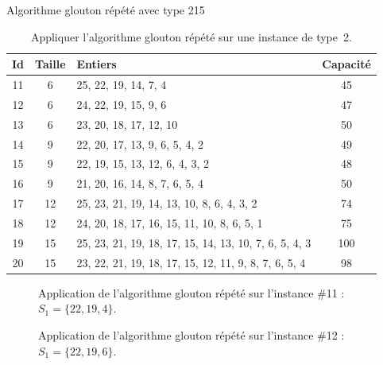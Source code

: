 \begin{exercice}[label=ex:MTGS2]{Algorithme glouton répété avec type 2}{15}

\begin{table}[H]
\centering
\begin{tabular}{cclc}
  \toprule
Id & Taille & Entiers & Capacité \\
  \midrule
 11 &   6 & 25, 22, 19, 14, 7, 4 &  45 \\
   12 &   6 & 24, 22, 19, 15, 9, 6 &  47 \\
   13 &   6 & 23, 20, 18, 17, 12, 10 &  50 \\
   14 &   9 & 22, 20, 17, 13, 9, 6, 5, 4, 2 &  49 \\
   15 &   9 & 22, 19, 15, 13, 12, 6, 4, 3, 2 &  48 \\
   16 &   9 & 21, 20, 16, 14, 8, 7, 6, 5, 4 &  50 \\
   17 &  12 & 25, 23, 21, 19, 14, 13, 10, 8, 6, 4, 3, 2 &  74 \\
   18 &  12 & 24, 20, 18, 17, 16, 15, 11, 10, 8, 6, 5, 1 &  75 \\
   19 &  15 & 25, 23, 21, 19, 18, 17, 15, 14, 13, 10, 7, 6, 5, 4, 3 & 100 \\
   20 &  15 & 23, 22, 21, 19, 18, 17, 15, 12, 11, 9, 8, 7, 6, 5, 4 &  98 \\
   \bottomrule
\end{tabular}
\caption{Appliquer l'algorithme glouton répété sur une instance de type~2.}
\label{tab:MTGS2}
\end{table}

\end{exercice}

\begin{figure}[htbp]
\centering
{}
\caption{Application de l'algorithme glouton répété sur l'instance \#11 : $S_1 = \{22,19,4\}$.}
\label{fig:MTGS2-11}
\end{figure}

\ifshowsols

\begin{figure}[htbp]
\centering
{}
\caption{Application de l'algorithme glouton répété sur l'instance \#12 : $S_1 = \{22,19,6\}$.}
\label{fig:MTGS2-12}
\end{figure}

